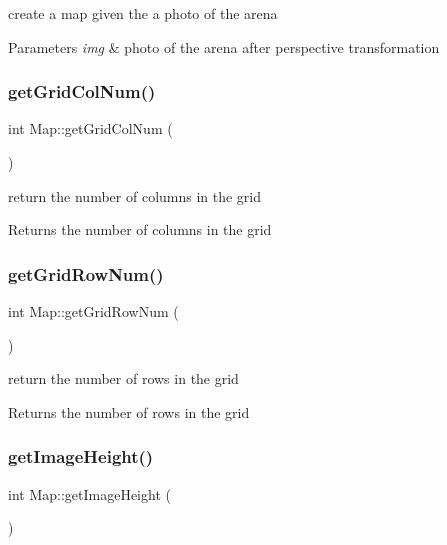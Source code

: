 create a map given the a photo of the arena 
\begin{DoxyParams}{Parameters}
{\em img} & photo of the arena after perspective transformation \\
\hline
\end{DoxyParams}
\mbox{\label{class_map_a56085c67347222241299765fe89e615d}} 
\subsubsection{\texorpdfstring{get\+Grid\+Col\+Num()}{getGridColNum()}}
{\footnotesize\ttfamily int Map\+::get\+Grid\+Col\+Num (\begin{DoxyParamCaption}{ }\end{DoxyParamCaption})}



return the number of columns in the grid 

\begin{DoxyReturn}{Returns}
the number of columns in the grid 
\end{DoxyReturn}
\mbox{\label{class_map_a1cb1dccec0a3f9f2d25f5f3dfb224942}} 
\subsubsection{\texorpdfstring{get\+Grid\+Row\+Num()}{getGridRowNum()}}
{\footnotesize\ttfamily int Map\+::get\+Grid\+Row\+Num (\begin{DoxyParamCaption}{ }\end{DoxyParamCaption})}



return the number of rows in the grid 

\begin{DoxyReturn}{Returns}
the number of rows in the grid 
\end{DoxyReturn}
\mbox{\label{class_map_a77781f371aaf9f386f993714dbef40ec}} 
\subsubsection{\texorpdfstring{get\+Image\+Height()}{getImageHeight()}}
{\footnotesize\ttfamily int Map\+::get\+Image\+Height (\begin{DoxyParamCaption}{ }\end{DoxyParamCaption})}




